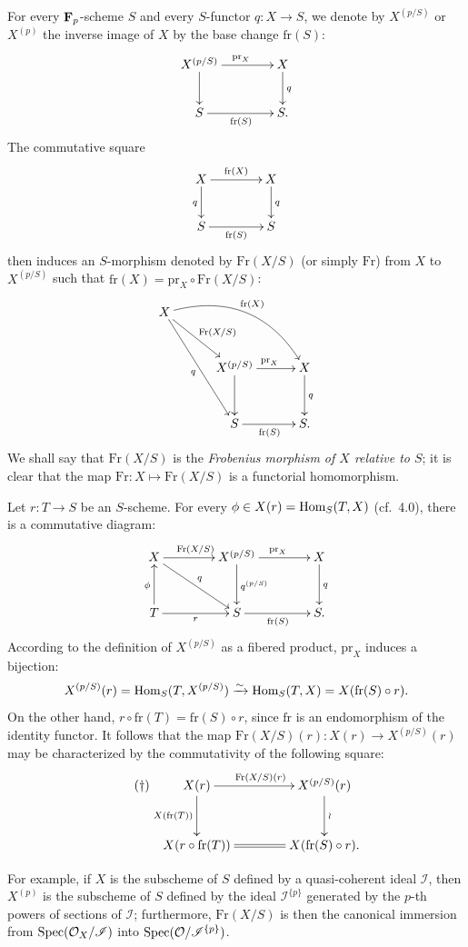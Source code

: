 For every $\mathbf{F}_p$-scheme $S$ and every $S$-functor $q:X\to S$, we denote by $X^{(p/S)}$ or $X^{(p)}$ the inverse image of $X$ by the base change $\mathrm{fr}(S)$:
\[
\xymatrix@C=4em{X^{(p/S)}\ar[r]^{\mathrm{pr}_X}\ar[d]&X\ar[d]^q\\S\ar[r]_{\mathrm{fr}(S)}&S.}
\]
The commutative square
\[
\xymatrix@C=4em{X\ar[r]^{\mathrm{fr}(X)}\ar[d]_q&X\ar[d]^q\\S\ar[r]_{\mathrm{fr}(S)}&S}
\]
then induces an $S$-morphism denoted by $\mathrm{Fr}(X/S)$ (or simply $\mathrm{Fr}$) from $X$ to $X^{(p/S)}$ such that $\mathrm{fr}(X)=\mathrm{pr}_X\circ\mathrm{Fr}(X/S)$:
\[
\xymatrix@C=3em@R=3em{X\ar[dr]^{\mathrm{Fr}(X/S)}\ar@/^2pc/[drr]^{\mathrm{fr}(X)}\ar[ddr]_q&&\\
&X^{(p/S)}\ar[r]^{\mathrm{pr}_X}\ar[d]&X\ar[d]^q\\
&S\ar[r]_{\mathrm{fr}(S)}&S.}
\]
We shall say that $\mathrm{Fr}(X/S)$ is the \emph{Frobenius morphism of $X$ relative to $S$}; it is clear that the map $\mathrm{Fr}:X\mapsto\mathrm{Fr}(X/S)$ is a functorial homomorphism.

Let $r:T\to S$ be an $S$-scheme. For every $\phi\in X(r)=\operatorname{Hom}_S(T,X)$ (cf.\ 4.0), there is a commutative diagram:
\[
\xymatrix@C=4em@R=3em{X\ar[r]^{\mathrm{Fr}(X/S)}\ar[dr]^q&X^{(p/S)}\ar[r]^{\mathrm{pr}_X}\ar[d]^{q^{(p/S)}}&X\ar[d]^q\\
T\ar[u]^\phi\ar[r]_r&S\ar[r]_{\mathrm{fr}(S)}&S.}
\]
According to the definition of $X^{(p/S)}$ as a fibered product, $\mathrm{pr}_X$ induces a bijection:
\[
X^{(p/S)}(r)=\operatorname{Hom}_S(T,X^{(p/S)})\xrightarrow{\sim}\operatorname{Hom}_S(T,X)=X(\mathrm{fr}(S)\circ r).
\]
On the other hand, $r\circ\mathrm{fr}(T)=\mathrm{fr}(S)\circ r$, since $\mathrm{fr}$ is an endomorphism of the identity functor. It follows that the map $\mathrm{Fr}(X/S)(r):X(r)\to X^{(p/S)}(r)$ may be characterized by the commutativity of the following square:
\begin{equation}\tag{$\dagger$}
\xymatrix@C=4em@R=3em{X(r)\ar[r]^{\mathrm{Fr}(X/S)(r)}\ar[d]_{X(\mathrm{fr}(T))}&X^{(p/S)}(r)\ar[d]^\wr\\
X(r\circ\mathrm{fr}(T))\ar@{=}[r]&X(\mathrm{fr}(S)\circ r).}
\end{equation}

For example, if $X$ is the subscheme of $S$ defined by a quasi-coherent ideal $\mathscr I$, then $X^{(p)}$ is the subscheme of $S$ defined by the ideal $\mathscr I^{\{p\}}$ generated by the $p$-th powers of sections of $\mathscr I$; furthermore, $\mathrm{Fr}(X/S)$ is then the canonical immersion from $\operatorname{Spec}(\mathcal{O}_X/\mathscr I)$ into $\operatorname{Spec}(\mathcal{O}/\mathscr I^{\{p\}})$.

